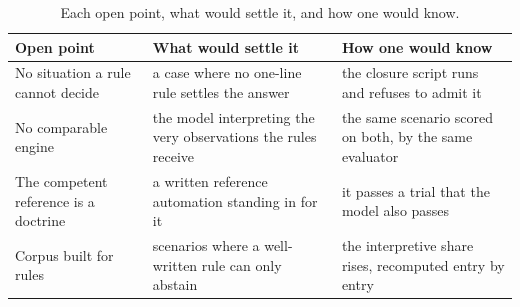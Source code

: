 \begin{table}[H]
\centering
\caption{Each open point, what would settle it, and how one would know.}
\label{tab:jusquou}
\small
\begin{tabularx}{\linewidth}{@{}>{\raggedright\arraybackslash}p{3.4cm}Y>{\raggedright\arraybackslash}p{4.0cm}@{}}
\toprule
Open point & What would settle it & How one would know \\
\midrule
No situation a rule cannot decide & a case where no one-line rule settles the answer &
the closure script runs and refuses to admit it \\
No comparable engine & the model interpreting the very observations the rules
receive & the same scenario scored on both, by the same evaluator \\
The competent reference is a doctrine & a written reference automation standing in
for it & it passes a trial that the model also passes \\
Corpus built for rules & scenarios where a well-written rule can only abstain &
the interpretive share rises, recomputed entry by entry \\
\bottomrule
\end{tabularx}
\end{table}
